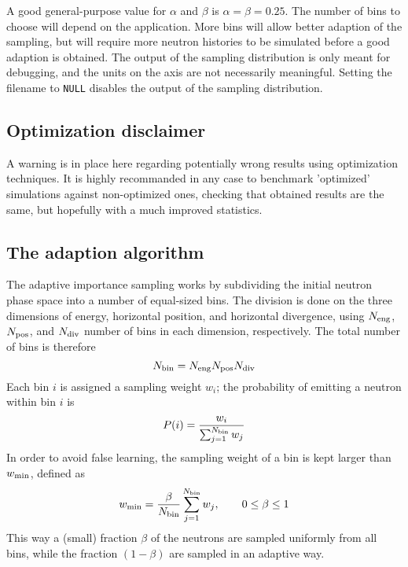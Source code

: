 A good general-purpose value for $\alpha$ and $\beta$ is $\alpha = \beta
= 0.25$. The number of bins to choose will depend on the
application. More bins will allow better adaption of the sampling, but
will require more neutron histories to be simulated before a good
adaption is obtained. The output of the sampling distribution is only
meant for debugging, and the units on the axis are not necessarily
meaningful. Setting the filename to \verb+NULL+ disables the output of
the sampling distribution.

\subsection{Optimization disclaimer}

A warning is in place here regarding potentially wrong results 
using optimization techniques.  
It is highly recommanded in any case to benchmark 'optimized' simulations 
against non-optimized ones, checking that obtained results are the same, 
but hopefully with a much improved statistics.

\subsection{The adaption algorithm}

The adaptive importance sampling works by subdividing the initial
neutron phase space into a number of equal-sized bins. The division is
done on the three dimensions of energy, horizontal position, and
horizontal divergence, using $N_{\rm eng}$, $N_{\rm pos}$, and $N_{\rm
  div}$ number of bins in each dimension, respectively. The total number
of bins is therefore
\begin{equation}
N_{\rm bin} = N_{\rm eng} N_{\rm pos} N_{\rm div}
\end{equation}
Each bin $i$ is assigned a sampling weight $w_i$; the probability of
emitting a neutron within bin $i$ is
\begin{equation}
P(i) = \frac{w_i}{\sum_{j=1}^{N_{\rm bin}} w_j}
\end{equation}
In order to avoid false learning, the sampling weight of a bin is
kept larger than $w_{\rm min}$, defined as
\begin{equation}
w_{\rm min} = \frac{\beta}{N_{\rm bin}}\sum_{j=1}^{N_{\rm bin}}w_j,\qquad
    0 \leq \beta \leq 1
\end{equation}
This way a (small) fraction $\beta$ of the neutrons are sampled
uniformly from all bins, while the fraction $(1 - \beta)$ are sampled in an adaptive way.

